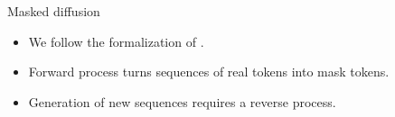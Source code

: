 \documentclass[normaltitle,first=orange,second=red,leqno]{aaltoslides}
\newcommand{\mask}{\texttt{[MASK]}}
\begin{document}
\begin{frame}{Masked diffusion}
    \begin{itemize}
        \item<1-> We follow the formalization of \citeauthor{shi2025simplifiedgeneralizedmaskeddiffusion}.
        \item<2-> Forward process turns sequences of real tokens into mask tokens.
        \item<3-> Generation of new sequences requires a reverse process.
    \end{itemize}
\end{frame}

\end{document}

